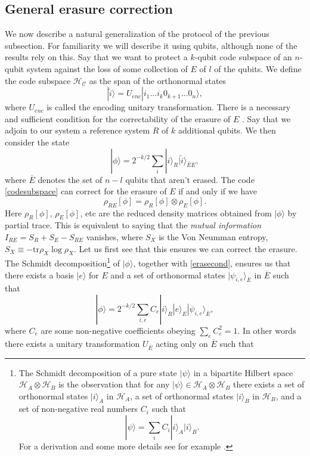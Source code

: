 \documentclass[12pt]{article}
\newcommand{\be}{\begin{equation}}
\newcommand{\ee}{\end{equation}}
\newcommand{\tr}{\mathrm{tr}}
\newcommand{\HC}{\mathcal{H}_{\mathcal{C}}}
\newcommand{\ran}{\rangle}
\newcommand{\wt}{\widetilde}
\begin{document}
\subsection{General erasure correction}\label{errcorsec}
We now describe a natural generalization of the protocol of the previous subsection. For familiarity we will describe it using qubits, although none of the results rely on this.  Say that we want to protect a $k$-qubit code subspace of an $n$-qubit system against the loss of some collection of $E$ of $l$ of the qubits.  We define the code subspace $\HC$ as the span of the orthonormal states
\be\label{codesubspace}
|\wt{i}\ran=U_{enc}|i_1 \ldots i_k 0_{k+1}\ldots 0_{n}\ran,
\ee
where $U_{enc}$ is called the encoding unitary transformation.  There is a necessary and sufficient condition for the correctability of the erasure of $E$ \cite{PhysRevA.54.2629}.  Say that we adjoin to our system a reference system $R$ of $k$ additional qubits.  We then consider the state
\be
|\phi\ran=2^{-k/2}\sum_i |i\ran_R |\wt{i}\ran_{\overline{E}E},
\ee
where $\overline{E}$ denotes the set of $n-l$ qubits that aren't erased.  The code \eqref{codesubspace} can correct for the erasure of $E$ if and only if we have
\be\label{erasecond}
\rho_{RE}[\phi]=\rho_{R}[\phi]\otimes \rho_{E}[\phi].
\ee
Here $\rho_R[\phi]$, $\rho_E[\phi]$, etc are the reduced density matrices obtained from $|\phi\ran$ by partial trace.  This is equivalent to saying that the \textit{mutual information} $I_{RE}=S_R+S_E-S_{RE}$ vanishes, where $S_X$ is the Von Neumman entropy, $S_X\equiv-\tr \rho_X \log \rho_X$.  Let us first see that this ensures we can correct the erasure.  The Schmidt decomposition\footnote{The Schmidt decomposition of a pure state $|\psi\ran$ in a bipartite Hilbert space $\mathcal{H}_A\otimes \mathcal{H}_B$ is the observation that for any $|\psi\ran\in \mathcal{H}_A\otimes \mathcal{H}_B$ there exists a set of orthonormal states $|i\ran_A$ in $\mathcal{H}_A$, a set of orthonormal states $|i\ran_B$ in $\mathcal{H}_B$, and a set of non-negative real numbers $C_i$ such that
\be
|\psi\ran=\sum_i C_i |i\ran_A |i\ran_B.
\ee
For a derivation and some more details see for example \cite{Harlow:2014yka}.} of $|\phi\ran$, together with \eqref{erasecond}, ensures us that there exists a basis $|e\ran$ for $E$ and a set of orthonormal states $|\psi_{i,e}\ran_{\overline{E}}$ in $\overline{E}$ such that
\be
|\phi\ran=2^{-k/2}\sum_{i,e}C_e|i\ran_R |e\ran_E |\psi_{i,e}\ran_{\overline{E}}, 
\ee
where $C_e$ are some non-negative coefficients obeying $\sum_e C_e^2=1$.  In other words there exists a unitary transformation $U_{\overline{E}}$ acting only on $\overline{E}$ such that
\end{document}
